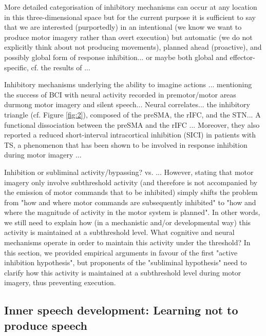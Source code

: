 \documentclass[utf8]{template/frontiersSCNS} %
\begin{document}
More detailed categorisation of inhibitory mechanisms can occur at any location in this three-dimensional space but for the current purpose it is sufficient to say that we are interested (purportedly) in an intentional (we know we want to produce motor imagery rather than overt execution) but automatic (we do not explicitly think about not producing movements), planned ahead (proactive), and possibly global form of response inhibition... or maybe both global and effector-specific, cf. the results of \cite{rieger_inhibition_2017}...

Inhibitory mechanisms underlying the ability to imagine actions \citep{guillot_imagining_2012, schwoebel_man_2002}... mentioning the success of BCI with neural activity recorded in premotor/motor areas durmong motor imagery and silent speech... Neural correlates... the inhibitory triangle (cf. Figure \ref{fig:2}), composed of the preSMA, the rIFC, and the STN... A functional dissociation between the preSMA and the rIFC \citep{diesburg_pause-then-cancel_2021}... Moreover, they also reported a reduced short-interval intracortical inhibition (SICI) in patients with TS, a phenomenon that has been shown to be involved in response inhibition during motor imagery \citep{neige_unravelling_2020}...

Inhibition or subliminal activity/bypassing? \citep{tian_mental_2012, tian_effect_2013, tian_mental_2016} vs. \cite{loevenbruck_cognitive_2018}... However, stating that motor imagery only involve subthreshold activity (and therefore is not accompanied by the emission of motor commands that to be inhibited) simply shifts the problem from "how and where motor commands are subsequently inhibited" to "how and where the magnitude of activity in the motor system is planned". In other words, we still need to explain how (in a mechanistic and/or developmental way) this activity is maintained at a subthreshold level. What cognitive and neural mechanisms operate in order to maintain this activity under the threshold? In this section, we provided empirical arguments in favour of the first "active inhibition hypothesis", but proponents of the "subliminal hypothesis" need to clarify how this activity is maintained at a subthreshold level during motor imagery, thus preventing execution.

\subsection{Inner speech development: Learning not to produce speech}
\end{document}
